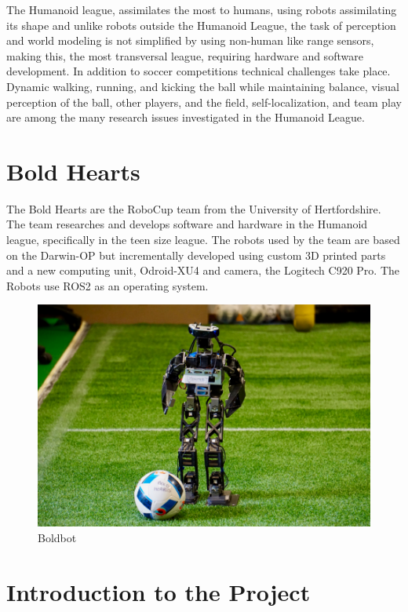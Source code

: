     The Humanoid league, assimilates the most to humans, using robots assimilating its shape and unlike robots outside the Humanoid League, the task of perception and world modeling is not simplified by using non-human like range sensors, making this, the most transversal league, requiring hardware and software development. 
    In addition to soccer competitions technical challenges take place. 
    Dynamic walking, running, and kicking the ball while maintaining balance, visual perception of the ball, other players, and the field, self-localization, and team play are among the many research issues investigated in the Humanoid League.

    \section{Bold Hearts}
    The Bold Hearts are the RoboCup team from the University of Hertfordshire. The team researches and develops software and hardware in the Humanoid league, specifically in the teen size league.
    The robots used by the team are based on the Darwin-OP but incrementally developed using custom 3D printed parts and a new computing unit, Odroid-XU4 and camera, the Logitech C920 Pro. 
    The Robots use ROS2 as an operating system.
    \cite{boldhearts}
    \begin{figure}[H]
        \centering
        \includegraphics[scale=0.26]{figures/boldbot_2.png}
        \caption{Boldbot}
    \end{figure}

    \section{Introduction to the Project}

